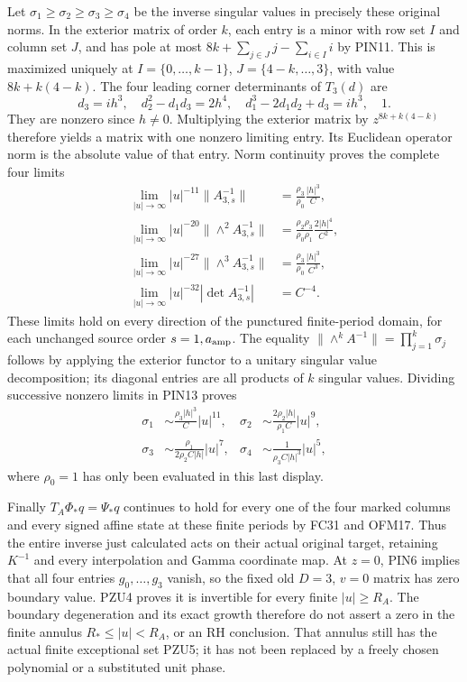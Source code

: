 \documentclass[11pt]{article}
\begin{document}
Let $\sigma_1\ge\sigma_2\ge\sigma_3\ge\sigma_4$ be the inverse
singular values in precisely these original norms. In the exterior
matrix of order $k$, each entry is a minor with row set $I$ and
column set $J$, and has pole at most
$8k+\sum_{j\in J}j-\sum_{i\in I}i$ by PIN11. This is maximized
uniquely at $I=\{0,\ldots,k-1\}$,
$J=\{4-k,\ldots,3\}$, with value $8k+k(4-k)$.
The four leading corner determinants of $T_3(d)$ are
\[
 d_3=ih^3,\quad d_2^2-d_1d_3=2h^4,\quad
 d_1^3-2d_1d_2+d_3=ih^3,\quad 1.
 \tag{PIN12}
\]
They are nonzero since $h\ne0$. Multiplying the exterior matrix
by $z^{8k+k(4-k)}$ therefore yields a matrix with one nonzero
limiting entry. Its Euclidean operator norm is the absolute value
of that entry. Norm continuity proves the complete four limits
\[
 \begin{split}
 \lim_{|u|\to\infty}|u|^{-11}\|A_{3,s}^{-1}\|
       &=\frac{\rho_3}{\rho_0}\frac{|h|^3}{C},\\
 \lim_{|u|\to\infty}|u|^{-20}\|\wedge^2 A_{3,s}^{-1}\|
       &=\frac{\rho_2\rho_3}{\rho_0\rho_1}\frac{2|h|^4}{C^2},\\
 \lim_{|u|\to\infty}|u|^{-27}\|\wedge^3 A_{3,s}^{-1}\|
       &=\frac{\rho_3}{\rho_0}\frac{|h|^3}{C^3},\\
 \lim_{|u|\to\infty}|u|^{-32}|\det A_{3,s}^{-1}|
       &=C^{-4}.
 \end{split}\tag{PIN13}
\]
These limits hold on every direction of the punctured finite-period
domain, for each unchanged source order $s=1,a_{\rm amp}$.
The equality $\|\wedge^k A^{-1}\|=\prod_{j=1}^k\sigma_j$
follows by applying the exterior functor to a unitary singular value
decomposition; its diagonal entries are all products of $k$ singular
values. Dividing successive nonzero limits in PIN13 proves
\[
 \begin{aligned}
 \sigma_1&\sim\frac{\rho_3|h|^3}{C}|u|^{11},&
 \sigma_2&\sim\frac{2\rho_2|h|}{\rho_1 C}|u|^9,\\
 \sigma_3&\sim\frac{\rho_1}{2\rho_2 C|h|}|u|^7,&
 \sigma_4&\sim\frac{1}{\rho_3C|h|^3}|u|^5,
 \end{aligned}\tag{PIN14}
\]
where $\rho_0=1$ has only been evaluated in this last display.

Finally $T_A\Phi_*q=\Psi_*q$ continues to hold for every one of
the four marked columns and every signed affine state at these
finite periods by FC31 and OFM17. Thus the entire inverse just
calculated acts on their actual original target, retaining $K^{-1}$
and every interpolation and Gamma coordinate map. At $z=0$, PIN6
implies that all four entries $g_0,\ldots,g_3$ vanish, so the fixed
old $D=3$, $v=0$ matrix has zero boundary value. PZU4 proves it is
invertible for every finite $|u|\ge R_A$. The boundary degeneration
and its exact growth therefore do not assert a zero in the finite
annulus $R_*\le|u|<R_A$, or an RH conclusion. That annulus still
has the actual finite exceptional set PZU5; it has not been replaced
by a freely chosen polynomial or a substituted unit phase.
\end{document}
